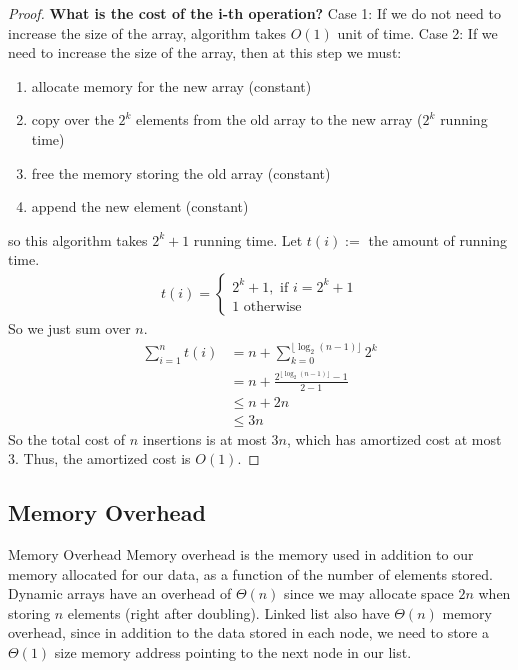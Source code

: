 \documentclass[11pt]{article}
\begin{document}
\begin{proof}
    \textbf{What is the cost of the i-th operation?} Case 1: If we do not need to increase the size 
    of the array, algorithm takes $O(1)$ unit of time. Case 2: If we need to increase the size of 
    the array, then at this step we must:
    \begin{enumerate}
        \item allocate memory for the new array (constant)
        \item copy over the $2^k$ elements from the old array to the new array ($2^k$ running time)
        \item free the memory storing the old array (constant)
        \item append the new element (constant)
    \end{enumerate}
    so this algorithm takes $2^k+1$ running time.
    Let $t(i):=$ the amount of running time.
    \begin{align*}
    t(i)= \begin{cases}
        2^k+1, \text{ if } i=2^k+1 \\
        1 \text{ otherwise}
    \end{cases}
    \end{align*}
    So we just sum over $n$.
    \begin{align*}
        \sum_{i=1}^{n} t(i) &= n + \sum_{{k=0}}^{\lfloor\log_2(n-1)\rfloor}2^k \\
        &= n+ \frac{2^{\lfloor\log_2(n-1)\rfloor}-1}{2-1} \\
        &\leq n+2n \\
        &\leq 3n
    \end{align*}
    So the total cost of $n$ insertions is at most $3n$, which has amortized cost at most $3$. 
    Thus, the amortized cost is $O(1)$.
\end{proof}

\subsection{Memory Overhead}

\begin{definitionbox}{Memory Overhead}
    Memory overhead is the memory used in addition to our memory allocated for our data, as a
    function of the number of elements stored. Dynamic arrays have an overhead of $\Theta(n)$ since
    we may allocate space $2n$ when storing $n$ elements (right after doubling). Linked list also
    have $\Theta(n)$ memory overhead, since in addition to the data stored in each node, we need to
    store a $\Theta(1)$ size memory address pointing to the next node in our list.
\end{definitionbox}
\end{document}
